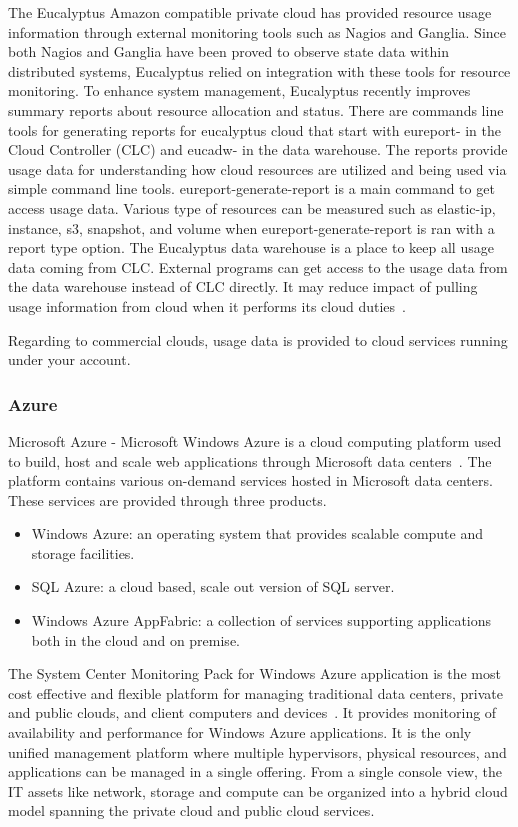 \documentclass{sig-alternate-05-2015}
\begin{document}
The Eucalyptus Amazon compatible private cloud has provided resource usage information through external monitoring tools such as Nagios and Ganglia. Since both Nagios and Ganglia have been proved to observe state data within distributed systems, Eucalyptus relied on integration with these tools for resource monitoring. To enhance system management, Eucalyptus recently improves summary reports about resource allocation and status. There are commands line tools for generating reports for eucalyptus cloud that start with eureport- in the Cloud Controller (CLC) and eucadw- in the data warehouse. The reports provide usage data for understanding how cloud resources are utilized and being used via simple command line tools. eureport-generate-report is a main command to get access usage data. Various type of resources can be measured such as elastic-ip, instance, s3, snapshot, and volume when eureport-generate-report is ran with a report type option. The Eucalyptus data warehouse is a place to keep all usage data coming from CLC. External programs can get access to the usage data from the data warehouse instead of CLC directly. It may reduce impact of pulling usage information from cloud when it performs its cloud duties~\cite{Euca2ools14}.

Regarding to commercial clouds, usage data is provided to cloud services running under your account.

\subsubsection{Azure}

Microsoft Azure - Microsoft Windows Azure is a cloud computing platform used to build, host and scale web applications through Microsoft data centers~\cite{azure11}. The platform contains various on-demand services hosted in Microsoft data centers. These services are provided through three products.

\begin{itemize}
 \item Windows Azure: an operating system that provides scalable compute and storage facilities.
 \item SQL Azure: a cloud based, scale out version of SQL server.
 \item Windows Azure AppFabric: a collection of services supporting applications both in the cloud and on premise.
\end{itemize}

The System Center Monitoring Pack for Windows Azure application is the most cost effective and flexible platform for managing traditional data centers, private and public clouds, and client computers and devices~\cite{MonitoringPackAzure11}. It provides monitoring of availability and performance for Windows Azure applications. It is the only unified management platform where multiple hypervisors, physical resources, and applications can be managed in a single offering. From a single console view, the IT assets like network, storage and compute can be organized into a hybrid cloud model spanning the private cloud and public cloud services.
\end{document}
